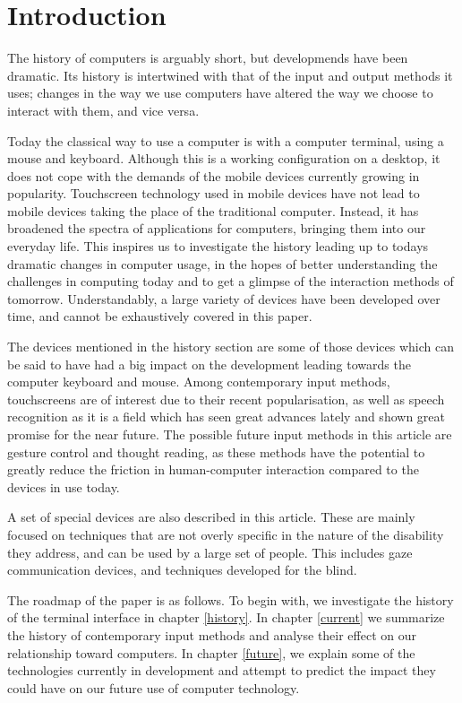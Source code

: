 
\section{Introduction}

The history of computers is arguably short, but developmends have been dramatic. Its history is intertwined with that of the input and output methods it uses; changes in the way we use computers have altered the way we choose to interact with them, and vice versa. 

Today the classical way to use a computer is with a computer terminal, using a mouse and keyboard. Although this is a working configuration on a desktop, it does not cope with the demands of the mobile devices currently growing in popularity. Touchscreen technology used in mobile devices have not lead to mobile devices taking the place of the traditional computer. Instead, it has broadened the spectra of applications for computers, bringing them into our everyday life. This inspires us to investigate the history leading up to todays dramatic changes in computer usage, in the hopes of better understanding the challenges in computing today and to get a glimpse of the interaction methods of tomorrow. Understandably, a large variety of devices have been developed over time, and cannot be exhaustively covered in this paper.

The devices mentioned in the history section are some of those devices which can be said to have had a big impact on the development leading towards the computer keyboard and mouse. Among contemporary input methods, touchscreens are of interest due to their recent popularisation, as well as speech recognition as it is a field which has seen great advances lately and shown great promise for the near future. The possible future input methods in this article are gesture control and thought reading, as these methods have the potential to greatly reduce the friction in human-computer interaction compared to the devices in use today.

A set of special devices are also described in this article. These are mainly focused on techniques that are not overly specific in the nature of the disability they address, and can be used by a large set of people. This includes gaze communication devices, and techniques developed for the blind.

The roadmap of the paper is as follows. To begin with, we investigate the history of the terminal interface in chapter \ref{history}. In chapter \ref{current} we summarize the history of contemporary input methods and analyse their effect on our relationship toward computers. In chapter \ref{future}, we explain some of the technologies currently in development and attempt to predict the impact they could have on our future use of computer technology.
